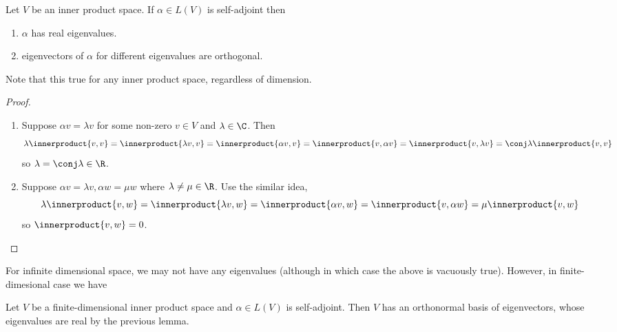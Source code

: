 \documentclass[a4paper]{article}
\newcommand*{\ip}{\innerproduct}
\theoremstyle{definition}
\begin{document}
\begin{lemma}
  Let \(V\) be an inner product space. If \(\alpha \in L(V)\) is self-adjoint then
  \begin{enumerate}
  \item \(\alpha\) has real eigenvalues.
  \item eigenvectors of \(\alpha\) for different eigenvalues are orthogonal.
  \end{enumerate}
\end{lemma}

Note that this true for any inner product space, regardless of dimension.

\begin{proof}\leavevmode
  \begin{enumerate}
  \item Suppose \(\alpha v = \lambda v\) for some non-zero \(v \in V\) and \(\lambda \in \C\). Then
    \[
      \lambda \ip{v, v} = \ip{\lambda v, v} = \ip{\alpha v, v} = \ip{v, \alpha v} = \ip{v, \lambda v} = \conj \lambda \ip{v, v}
    \]
    so \(\lambda = \conj \lambda \in \R\).
  \item Suppose \(\alpha v = \lambda v, \alpha w = \mu w\) where \(\lambda \neq \mu \in \R\). Use the similar idea,
    \[
      \lambda \ip{v, w} = \ip{\lambda v, w} = \ip{\alpha v, w} = \ip{v, \alpha w} = \mu \ip{v, w}
    \]
    so \(\ip{v, w} = 0\).
  \end{enumerate}
\end{proof}

For infinite dimensional space, we may not have any eigenvalues (although in which case the above is vacuously true). However, in finite-dimesional case we have

\begin{theorem}
  Let \(V\) be a finite-dimensional inner product space and \(\alpha \in L(V)\) is self-adjoint. Then \(V\) has an orthonormal basis of eigenvectors, whose eigenvalues are real by the previous lemma.
\end{theorem}
\end{document}
